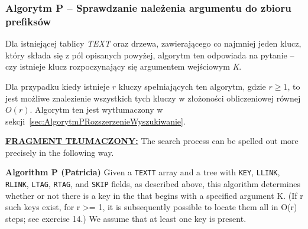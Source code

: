	\subsubsection{Algorytm P -- Sprawdzanie należenia argumentu do zbioru prefiksów}\label{sec:AlgorytmP}
	
	Dla istniejącej tablicy \emph{TEXT} oraz drzewa, zawierającego co najmniej jeden klucz, który składa się z pól opisanych powyżej, algorytm ten odpowiada na pytanie -- czy istnieje klucz rozpoczynający się argumentem wejściowym \emph{K}.
	
	Dla przypadku kiedy istnieje $r$ kluczy spełniających ten algorytm, gdzie $r \geq 1$, to jest możliwe znalezienie wszystkich tych kluczy w złożoności obliczeniowej równej $O(r)$. Algorytm ten jest wytłumaczony w sekcji~\ref{sec:AlgorytmPRozszerzenieWyszukiwanie}.
	
	\ifsourcematerial
	\begin{displayquote}
		\color{ao(english)}
		\underline{\textbf{FRAGMENT TŁUMACZONY:}} \newline
		The search process can be spelled out more precisely in the following way.
		
		\textbf{Algorithm P (Patricia)} \newline
		Given a \texttt{TEXTT} array and a tree with \texttt{KEY}, \texttt{LLINK}, \texttt{RLINK}, \texttt{LTAG}, \texttt{RTAG}, and \texttt{SKIP} fields, as described above, this algorithm determines whether or not there is a key in the
		that begins with a specified argument K. (If r such keys exist, for r >= 1, it is subsequently possible to locate them all in O(r) steps; see exercise 14.) We assume that at least one key is present. \newline
	\end{displayquote}
	\fi
	
